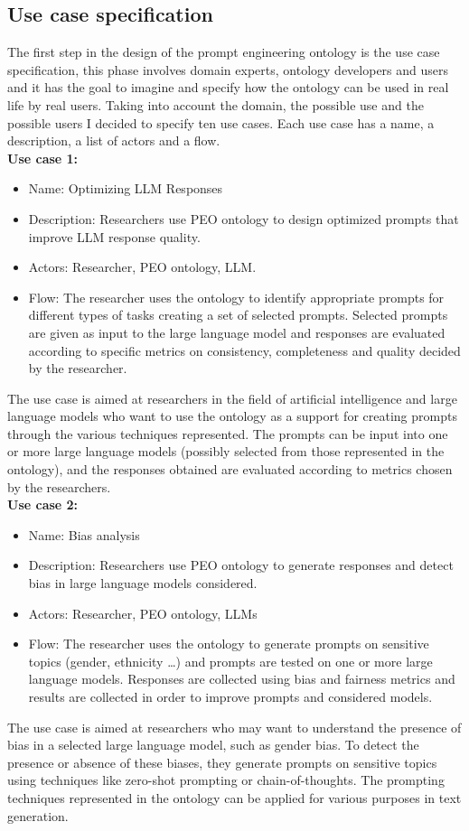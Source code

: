 \subsection{Use case specification}
The first step in the design of the prompt engineering ontology is the use case specification, this phase involves domain experts, ontology developers and users and it has the goal to imagine and specify how the ontology can be used in real life by real users. Taking into account the domain, the possible use and the possible users I decided to specify ten use cases. Each use case has a name, a description, a list of actors and a flow.\\

\textbf{Use case 1:}
\begin{itemize}
    \item Name: Optimizing LLM Responses
    \item Description: Researchers use PEO ontology to design optimized prompts that improve LLM response quality.
    \item Actors: Researcher, PEO ontology, LLM.
    \item Flow: The researcher uses the ontology to identify appropriate prompts for different types of tasks creating a set of selected prompts. Selected prompts are given as input to the large language model and responses are evaluated according to specific metrics on consistency, completeness and quality decided by the researcher.
\end{itemize}
The use case is aimed at researchers in the field of artificial intelligence and large language models who want to use the ontology as a support for creating prompts through the various techniques represented. The prompts can be input into one or more large language models (possibly selected from those represented in the ontology), and the responses obtained are evaluated according to metrics chosen by the researchers.\\

\textbf{Use case 2:}
\begin{itemize}
    \item Name: Bias analysis
    \item Description: Researchers use PEO ontology to generate responses and detect bias in large language models considered.
    \item Actors: Researcher, PEO ontology, LLMs
    \item Flow: The researcher uses the ontology to generate prompts on sensitive topics (gender, ethnicity …) and prompts are tested on one or more large language models. Responses are collected using bias and fairness metrics and results are collected in order to improve prompts and considered models. 
\end{itemize}
The use case is aimed at researchers who may want to understand the presence of bias in a selected large language model, such as gender bias. To detect the presence or absence of these biases, they generate prompts on sensitive topics using techniques like zero-shot prompting or chain-of-thoughts. The prompting techniques represented in the ontology can be applied for various purposes in text generation. \\

